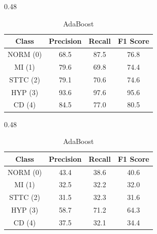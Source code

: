 \begin{table}[H]
    \begin{subtable}[t]{0.48\textwidth}
        \centering
        \caption{Histogram–based Gradient Boosting}
        \label{tab:cv_gb_ablation}
        \begin{tabular}{cccc}
            \toprule
            Class & Precision & Recall & F1 Score \\
            \midrule
            NORM (0) & 68.5 & 87.5 & 76.8 \\
            MI   (1) & 79.6 & 69.8 & 74.4 \\
            STTC (2) & 79.1 & 70.6 & 74.6 \\
            HYP  (3) & 93.6 & 97.6 & 95.6 \\
            CD   (4) & 84.5 & 77.0 & 80.5 \\
            \bottomrule
        \end{tabular}
    \end{subtable}
    \hfill
    \begin{subtable}[t]{0.48\textwidth}
        \centering
        \caption{AdaBoost}
        \label{tab:cv_ada_ablation}
        \begin{tabular}{cccc}
            \toprule
            Class & Precision & Recall & F1 Score \\
            \midrule
            NORM (0) & 43.4 & 38.6 & 40.6 \\
            MI   (1) & 32.5 & 32.2 & 32.0 \\
            STTC (2) & 31.5 & 32.3 & 31.6 \\
            HYP  (3) & 58.7 & 71.2 & 64.3 \\
            CD   (4) & 37.5 & 32.1 & 34.4 \\
            \bottomrule
        \end{tabular}
    \end{subtable}

    \bigskip


\end{table}
